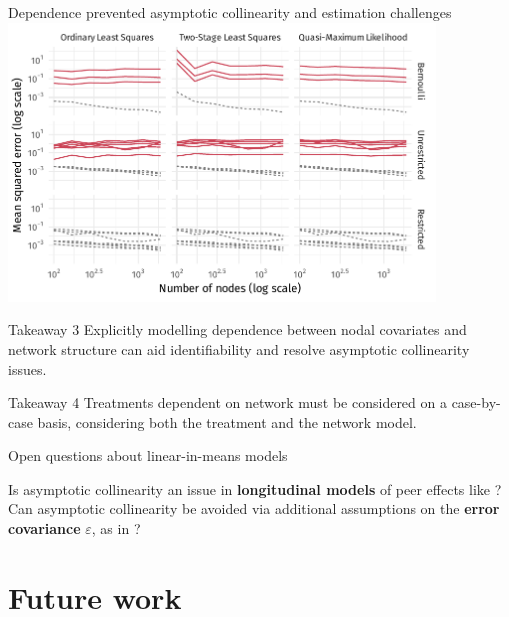 \documentclass[aspectratio=169]{beamer}
\theoremstyle{remark}
\begin{document}
\begin{frame}{Dependence prevented \textcolor{BrickRed}{asymptotic collinearity} and estimation challenges}
    \centering
    \includegraphics[width=0.85\textwidth]{./figures/simulations/jobtalk-mse-all.pdf}
\end{frame}

\begin{frame}

    \begin{block}{Takeaway 3}
        Explicitly modelling dependence between nodal covariates and network structure can aid identifiability and resolve asymptotic collinearity issues.
    \end{block}
    \vspace{4mm}
    \begin{block}{Takeaway 4}
        Treatments dependent on network must be considered on a case-by-case basis, considering both the treatment and the network model.
    \end{block}
\end{frame}


\begin{frame}{Open questions about linear-in-means models}
    
    Is asymptotic collinearity an issue in \textbf{longitudinal models} of peer effects like \cite{zhu2017, mcfowland2021, katsouris2024}? \\
    \vspace{8mm}
    Can asymptotic collinearity be avoided via additional assumptions on the \textbf{error covariance} $\varepsilon$, as in \cite{rose2017}? 
\end{frame}

\section{Future work}
\end{document}
